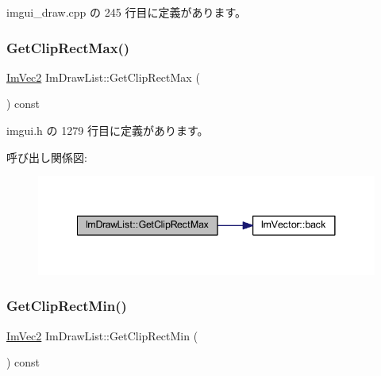  imgui\+\_\+draw.\+cpp の 245 行目に定義があります。

\mbox{\label{struct_im_draw_list_a8e484a61eab501c1c1c416a8b45bb08e}} 
\subsubsection{\texorpdfstring{Get\+Clip\+Rect\+Max()}{GetClipRectMax()}}
{\footnotesize\ttfamily \mbox{\hyperlink{struct_im_vec2}{Im\+Vec2}} Im\+Draw\+List\+::\+Get\+Clip\+Rect\+Max (\begin{DoxyParamCaption}{ }\end{DoxyParamCaption}) const\hspace{0.3cm}{\ttfamily [inline]}}



 imgui.\+h の 1279 行目に定義があります。

呼び出し関係図\+:\nopagebreak
\begin{figure}[H]
\begin{center}
\leavevmode
\includegraphics[width=341pt]{struct_im_draw_list_a8e484a61eab501c1c1c416a8b45bb08e_cgraph}
\end{center}
\end{figure}
\mbox{\label{struct_im_draw_list_a9d83896d3eb434a9e1072d56523a2754}} 
\subsubsection{\texorpdfstring{Get\+Clip\+Rect\+Min()}{GetClipRectMin()}}
{\footnotesize\ttfamily \mbox{\hyperlink{struct_im_vec2}{Im\+Vec2}} Im\+Draw\+List\+::\+Get\+Clip\+Rect\+Min (\begin{DoxyParamCaption}{ }\end{DoxyParamCaption}) const\hspace{0.3cm}{\ttfamily [inline]}}



